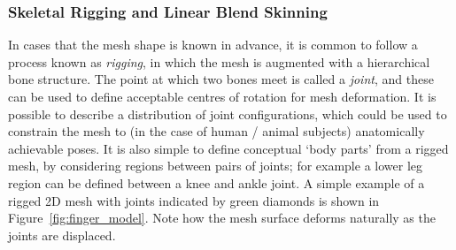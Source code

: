         \subsubsection{Skeletal Rigging and Linear Blend Skinning}
        In cases that the mesh shape is known in advance, it is common to follow a process known as \textit{rigging}, in which the mesh is augmented with a hierarchical bone structure. The point at which two bones meet is called a \emph{joint}, and these can be used to define acceptable centres of rotation for mesh deformation. It is possible to describe a distribution of joint configurations, which could be used to constrain the mesh to (in the case of human / animal subjects) anatomically achievable poses. It is also simple to define conceptual `body parts' from a rigged mesh, by considering regions between pairs of joints; for example a lower leg region can be defined between a knee and ankle joint. A simple example of a rigged 2D mesh with joints indicated by green diamonds is shown in Figure~\ref{fig:finger_model}. Note how the mesh surface deforms naturally as the joints are displaced.
        
